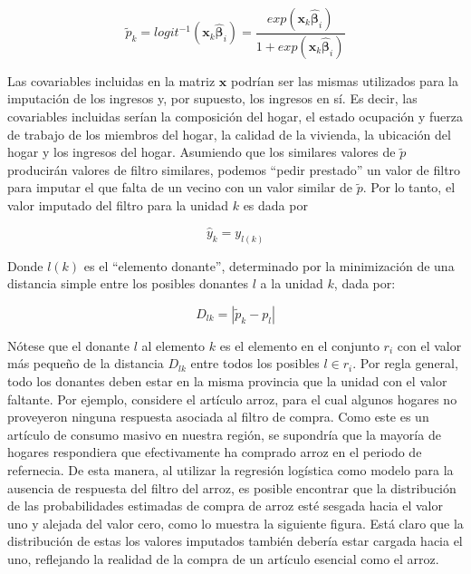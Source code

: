 \documentclass[
  10pt,
  spanish,
]{book}
\begin{document}
\[
\tilde{p}_k = logit^{-1}(\mathbf{x}_k \hat{\boldsymbol{\beta}}_i) =
\frac{exp(\mathbf{x}_k \hat{\boldsymbol{\beta}}_i)}{1+exp(\mathbf{x}_k \hat{\boldsymbol{\beta}}_i)}
\]

Las covariables incluidas en la matriz \(\mathbf{x}\) podrían ser las mismas utilizados para la imputación de los ingresos y, por supuesto, los ingresos en sí. Es decir, las covariables incluidas serían la composición del hogar, el estado ocupación y fuerza de trabajo de los miembros del hogar, la calidad de la vivienda, la ubicación del hogar y los ingresos del hogar. Asumiendo que los similares valores de \(\tilde p\) producirán valores de filtro similares, podemos ``pedir prestado'' un valor de filtro para imputar el que falta de un vecino con un valor similar de \(\tilde p\). Por lo tanto, el valor imputado del filtro para la unidad \(k\) es dada por

\[\hat{y}_k = y_{l(k)}\]

Donde \(l(k)\) es el ``elemento donante'', determinado por la minimización de una distancia simple entre los posibles donantes \(l\) a la unidad \(k\), dada por:

\[
D_{lk} = |\tilde p_k - p_l|
\]

Nótese que el donante \(l\) al elemento \(k\) es el elemento en el conjunto \(r_i\) con el valor más pequeño de la distancia \(D_{lk}\) entre todos los posibles \(l \in r_i\). Por regla general, todo los donantes deben estar en la misma provincia que la unidad con el valor faltante. Por ejemplo, considere el artículo arroz, para el cual algunos hogares no proveyeron ninguna respuesta asociada al filtro de compra. Como este es un artículo de consumo masivo en nuestra región, se supondría que la mayoría de hogares respondiera que efectivamente ha comprado arroz en el periodo de refernecia. De esta manera, al utilizar la regresión logística como modelo para la ausencia de respuesta del filtro del arroz, es posible encontrar que la distribución de las probabilidades estimadas de compra de arroz esté sesgada hacia el valor uno y alejada del valor cero, como lo muestra la siguiente figura. Está claro que la distribución de estas los valores imputados también debería estar cargada hacia el uno, reflejando la realidad de la compra de un artículo esencial como el arroz.
\end{document}
